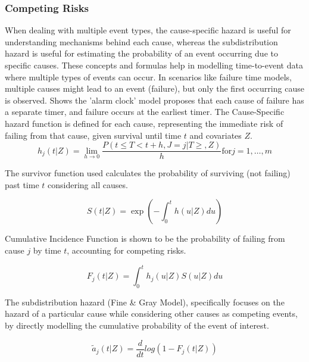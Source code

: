 \subsubsection{Competing Risks}
\noindent When dealing with multiple event types, the cause-specific hazard is useful for understanding mechanisms behind each cause, whereas the subdistribution hazard is useful for estimating the probability of an event occurring due to specific causes. These concepts and formulas help in modelling time-to-event data where multiple types of events can occur. In scenarios like failure time models, multiple causes might lead to an event (failure), but only the first occurring cause is observed. \parencite{kalbfleisch_fifty_2023} Shows the 'alarm clock' model proposes that each cause of failure has a separate timer, and failure occurs at the earliest timer. The Cause-Specific hazard function is defined for each cause, representing the immediate risk of failing from that cause, given survival until time \(t\) and covariates \(Z\).
\begin{equation} \label{eq:spesifichazard}h_{j}(t|Z) = \lim_{h \to 0} \frac{P(t \le T < t+h, J=j|T\ge,Z)}{h} \text{for} j=1,\dots,m\end{equation}

\noindent The survivor function used calculates the probability of surviving (not failing) past time \(t\) considering all causes.

\begin{equation} \label{eq:spesificsurvivor}S(t|Z) = \exp(-\int_{0}^{t} h(u|Z) du)\end{equation}

\noindent Cumulative Incidence Function is shown to be the probability of failing from cause \(j\) by time \(t\), accounting for competing risks.

\begin{equation} \label{eq:cumulativeincidence}F_{j}(t|Z) = \int_{0}^{t} h_{j}(u|Z)S(u|Z)du\end{equation}

\noindent The subdistribution hazard \parencite{kalbfleisch_fifty_2023}(Fine \& Gray Model), specifically focuses on the hazard of a particular cause while considering other causes as competing events, by directly modelling the cumulative probability of the event of interest.

\begin{equation} \label{eq:subdistribution}\tilde{a}_{j}(t|Z) = \frac{d}{dt}log(1-F_{j}(t|Z))\end{equation}

